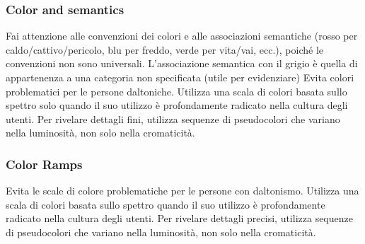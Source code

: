 \subsubsection{Color and semantics}
Fai attenzione alle convenzioni dei colori e alle associazioni semantiche (rosso per caldo/cattivo/pericolo, blu per freddo, verde per vita/vai, ecc.), 
poiché le convenzioni non sono universali. L'associazione semantica con il grigio è quella di appartenenza a una categoria non specificata (utile per evidenziare)
Evita colori problematici per le persone daltoniche.
Utilizza una scala di colori basata sullo spettro solo quando il suo utilizzo è profondamente radicato nella cultura degli utenti.
Per rivelare dettagli fini, utilizza sequenze di pseudocolori che variano nella luminosità, non solo nella cromaticità.
\subsubsection{Color Ramps}
Evita le scale di colore problematiche per le persone con daltonismo.
Utilizza una scala di colori basata sullo spettro quando il suo utilizzo è profondamente radicato nella cultura degli utenti.
Per rivelare dettagli precisi, utilizza sequenze di pseudocolori che variano nella luminosità, non solo nella cromaticità.